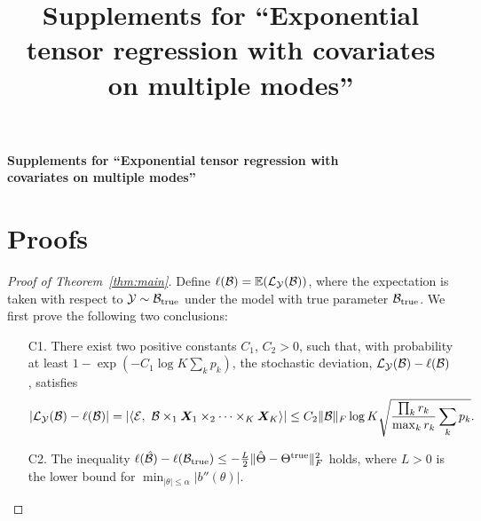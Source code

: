 \documentclass[11pt]{article}
\title{Supplements for ``Exponential tensor regression with covariates on multiple modes''}
\theoremstyle{plain}
\theoremstyle{definition}
\begin{document}
\begin{center}
\begin{spacing}{1.5}
\textbf{\Large Supplements for ``Exponential tensor regression with \\
covariates on multiple modes''}
\end{spacing}
\end{center}

\section{Proofs}
\begin{proof}[Proof of Theorem~\ref{thm:main}]
Define $\ell(\mathcal{B})=\mathbb{E}(\mathcal{L}_{\mathcal{Y}}(\mathcal{B}))$, where the expectation is taken with respect to $\mathcal{Y}\sim \mathcal{B}_{\text{true}}$ under the model with true parameter $\mathcal{B}_{\text{true}}$. We first prove the following two conclusions:
\begin{enumerate}
\item[C1.] There exist two positive constants $C_1$, $C_2>0$, such that, with probability at least $1-\exp(-C_1\log K\sum_k p_k)$, the stochastic deviation, $\mathcal{L}_{\mathcal{Y}}(\mathcal{B})-\ell(\mathcal{B})$, satisfies
\[
|\tL_{\tY}(\tB)-\ell(\tB)|=|\langle \tE,\ \tB\times_1\mX_1\times_2\cdots\times_K \mX_K\rangle| \leq C_2\FnormSize{}{\tB} \log K\sqrt{{\prod_k r_k \over \max_k r_k} \sum_k p_k}.
\]
\item[C2.] The inequality $\ell(\hat {\mathcal{B}}) - \ell(\mathcal{B}_{\text{true}}) \leq  -{L\over 2}\lVert\hat \Theta-\Theta^{\text{true}}\rVert_F^2$ holds, where $L>0$ is the lower bound for $\min_{|\theta|\leq \alpha}|b''(\theta)|$. 
\end{enumerate}


\end{proof}
\end{document}
